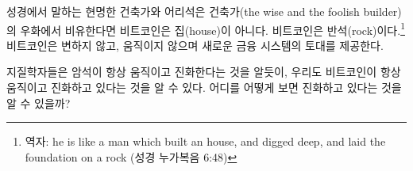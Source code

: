 			\begin{comment}
				Arguably, in this parable of the wise and the foolish builders Bitcoin
				isn't the house. It is the rock. Unchangeable, unmoving, providing the
				foundation for a new financial system.
			\end{comment}
			성경에서 말하는 현명한 건축가와 어리석은 건축가(the wise and the foolish builder)의 우화에서 비유한다면
			비트코인은 집(house)이 아니다. 비트코인은 반석(rock)이다.\footnote{역자: he is like a man which built an house, and digged deep, and laid the foundation on a rock (성경 누가복음 6:48)}
			비트코인은 변하지 않고, 움직이지 않으며 새로운 금융 시스템의 토대를 제공한다.
			
			\begin{comment}
				Just like geologists, who know that rock formations are always moving
				and evolving, one can see that Bitcoin is always moving and evolving as
				well. You just have to know where to look and how to look at it.
			\end{comment}
			지질학자들은 암석이 항상 움직이고 진화한다는 것을 알듯이,
			우리도 비트코인이 항상 움직이고 진화하고 있다는 것을 알 수 있다.
			어디를 어떻게 보면 진화하고 있다는 것을 알 수 있을까?
			
